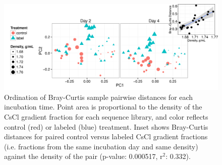 \begin{figure}[h!]
  \centering
  \includegraphics[width=1.0\textwidth]{figures/ordination_all_day_facet/ordination_day_facet_w_inset.png}
  \caption{Ordination of Bray-Curtis sample pairwise distances for each incubation time. Point area is proportional to the density of the CsCl gradient fraction for each sequence library, and color reflects control (red) or labeled (blue) treatment. Inset shows Bray-Curtis distances for paired control versus labeled CsCl gradient fractions (i.e. fractions from the same incubation day and same density) against the density of the pair (p-value: 0.000517, r$^{2}$: 0.332).}
  \label{fig:ordination}
\end{figure}

